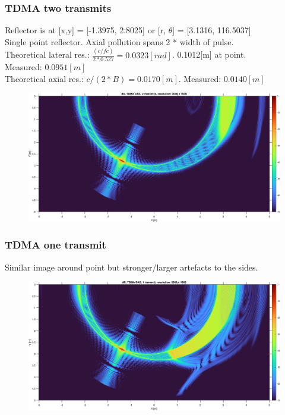 \documentclass{beamer}
\begin{document}
\begin{frame}
	\frametitle{TDMA two transmits}
	Reflector is at [x,y] = [-1.3975, 2.8025] or [r, $\theta$] = [3.1316, 116.5037]\\
	Single point reflector. Axial pollution spans 2 * width of pulse.\\
	Theoretical lateral res.: $\frac{(c/fc)}{2 * 0.527} = 0.0323 [rad]$. 0.1012[m] at point.\\ 			Measured: $0.0951[m]$\\ 
	Theoretical axial res.: $c / (2*B) = 0.0170[m]$. Measured: $0.0140[m]$\\
	\begin{figure}
    	\includegraphics[scale=0.31]{tdma_2t.eps}\\	
	\end{figure}	
\end{frame}

\begin{frame}
	\frametitle{TDMA one transmit}
	Similar image around point but stronger/larger artefacts to the sides.\\
	\begin{figure}
    	\includegraphics[scale=0.33]{tdma_1t.eps}\\	
	\end{figure}
\end{frame}
\end{document}
